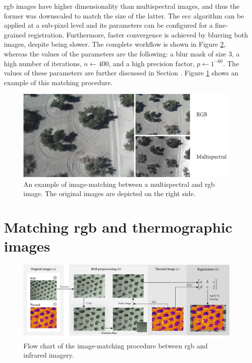 \acrshort{rgb} images have higher dimensionality than multispectral images, and thus the former was downscaled to match the size of the latter. The \acrshort{ecc} algorithm can be applied at a sub-pixel level and its parameters can be configured for a fine-grained registration. Furthermore, faster convergence is achieved by blurring both images, despite being slower. The complete workflow is shown in Figure \ref{fig:thermal_registration}, whereas the values of the parameters are the following: a blur mask of size 3, a high number of iterations, $n \gets 400$, and a high precision factor, $p \gets 1^{-60}$. The values of these parameters are further discussed in Section . Figure \ref{fig:rgb_multi_registration_result} shows an example of this matching procedure.

\begin{figure}[ht]
    \centering
    \includegraphics{figs/image_fusion/rgb_multispectral_registration_result.png}
    \caption{An example of image-matching between a multispectral and \acrshort{rgb} image. The original images are depicted on the right side.}
    \label{fig:rgb_multi_registration_result}
\end{figure}

\section{Matching \acrshort{rgb} and thermographic images}

\begin{figure}
    \includegraphics{figs/image_fusion/thermal_registration.png}
    \caption{Flow chart of the image-matching procedure between \acrshort{rgb} and infrared imagery.}
    \label{fig:thermal_registration}
\end{figure}

